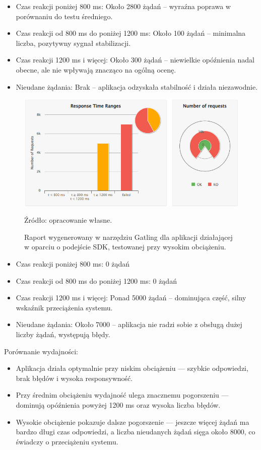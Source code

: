 \documentclass[runningheads,12pt]{llncs}
\begin{document}
\begin{itemize}
    \item Czas reakcji poniżej 800 ms: Około 2800 żądań – wyraźna poprawa w porównaniu do testu średniego.
    \item Czas reakcji od 800 ms do poniżej 1200 ms: Około 100 żądań – minimalna liczba, pozytywny sygnał stabilizacji.
    \item Czas reakcji 1200 ms i więcej: Około 300 żądań – niewielkie opóźnienia nadal obecne, ale nie wpływają znacząco na ogólną ocenę.
    \item Nieudane żądania: Brak – aplikacja odzyskała stabilność i działa niezawodnie.
\end{itemize}

\newpage

\begin{figure}
    \centering
    \includegraphics[width=0.8\linewidth]{images/sdk-gatling-high-graph.jpg}
    \caption{Raport wygenerowany w narzędziu Gatling dla aplikacji działającej w oparciu o podejście SDK, testowanej przy wysokim obciążeniu.}
    \label{fig:high}
    \vspace{0.5em}
    {\small Źródło: opracowanie własne.}
\end{figure}

\begin{itemize}
    \item Czas reakcji poniżej 800 ms: 0 żądań
    \item Czas reakcji od 800 ms do poniżej 1200 ms:  0 żądań
    \item Czas reakcji 1200 ms i więcej: Ponad 5000 żądań – dominująca część, silny wskaźnik przeciążenia systemu.
    \item Nieudane żądania: Około 7000 – aplikacja nie radzi sobie z obsługą dużej liczby żądań, występują błędy.
\end{itemize}

Porównanie wydajności: 

\begin{itemize}
    \item Aplikacja działa optymalnie przy niskim obciążeniu — szybkie odpowiedzi, brak błędów i wysoka responsywność.
    \item Przy średnim obciążeniu wydajność ulega znacznemu pogorszeniu — dominują opóźnienia powyżej 1200 ms oraz wysoka liczba błędów.
    \item Wysokie obciążenie pokazuje dalsze pogorszenie — jeszcze więcej żądań ma bardzo długi czas odpowiedzi, a liczba nieudanych żądań sięga około 8000, co świadczy o przeciążeniu systemu.
\end{itemize}
\end{document}

